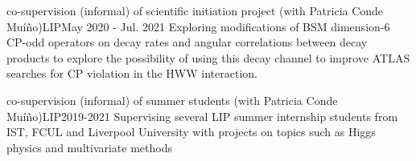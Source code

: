 \begin{cventries}
    
    {co-supervision (informal) of scientific initiation project (with Patricia Conde Muíño)}{LIP}{May 2020 - Jul. 2021}
    {
        Exploring modifications of BSM dimension-6 CP-odd operators on decay rates and angular correlations between decay products to explore the possibility of using this decay channel to improve ATLAS searches for CP violation in the HWW interaction.
    }

    {co-supervision (informal) of summer students (with Patricia Conde Muíño)}{LIP}{2019-2021}
    {Supervising several LIP summer internship students from IST, FCUL and Liverpool University with projects on topics such as Higgs physics and multivariate methods}
    
\end{cventries}
